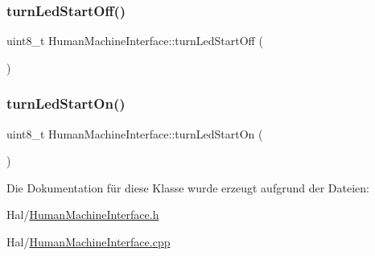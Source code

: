 \subsubsection{\texorpdfstring{turn\+Led\+Start\+Off()}{turnLedStartOff()}}
{\footnotesize\ttfamily uint8\+\_\+t Human\+Machine\+Interface\+::turn\+Led\+Start\+Off (\begin{DoxyParamCaption}{ }\end{DoxyParamCaption})}

\hypertarget{class_human_machine_interface_a46dca7b3435dc4b20a2db67b301cb36d}{}\label{class_human_machine_interface_a46dca7b3435dc4b20a2db67b301cb36d} 
\subsubsection{\texorpdfstring{turn\+Led\+Start\+On()}{turnLedStartOn()}}
{\footnotesize\ttfamily uint8\+\_\+t Human\+Machine\+Interface\+::turn\+Led\+Start\+On (\begin{DoxyParamCaption}{ }\end{DoxyParamCaption})}



Die Dokumentation für diese Klasse wurde erzeugt aufgrund der Dateien\+:\begin{DoxyCompactItemize}
\item 
Hal/\hyperlink{_human_machine_interface_8h}{Human\+Machine\+Interface.\+h}\item 
Hal/\hyperlink{_human_machine_interface_8cpp}{Human\+Machine\+Interface.\+cpp}\end{DoxyCompactItemize}
